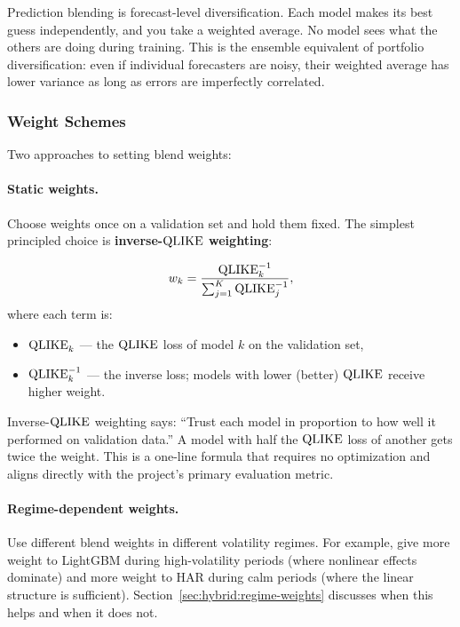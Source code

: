 \begin{intuition}
Prediction blending is forecast-level diversification.  Each model
makes its best guess independently, and you take a weighted average.
No model sees what the others are doing during training.  This is the
ensemble equivalent of portfolio diversification: even if individual
forecasters are noisy, their weighted average has lower variance as
long as errors are imperfectly correlated.
\end{intuition}

\subsubsection{Weight Schemes}

Two approaches to setting blend weights:

\paragraph{Static weights.}
Choose weights once on a validation set and hold them fixed.  The
simplest principled choice is \textbf{inverse-$\operatorname{QLIKE}$ weighting}:

\begin{equation}\label{eq:inv-qlike-weights}
  w_k = \frac{\operatorname{QLIKE}_k^{-1}}{\sum_{j=1}^{K}\operatorname{QLIKE}_j^{-1}},
\end{equation}
where each term is:
\begin{itemize}
  \item $\operatorname{QLIKE}_k$ --- the $\operatorname{QLIKE}$ loss of model $k$ on the
        validation set,
  \item $\operatorname{QLIKE}_k^{-1}$ --- the inverse loss; models with lower
        (better) $\operatorname{QLIKE}$ receive higher weight.
\end{itemize}

\begin{intuition}
Inverse-$\operatorname{QLIKE}$ weighting says: ``Trust each model in proportion to
how well it performed on validation data.''  A model with half the
$\operatorname{QLIKE}$ loss of another gets twice the weight.  This is a one-line
formula that requires no optimization and aligns directly with the
project's primary evaluation metric.
\end{intuition}

\paragraph{Regime-dependent weights.}
Use different blend weights in different volatility regimes.  For
example, give more weight to LightGBM during high-volatility periods
(where nonlinear effects dominate) and more weight to HAR during calm
periods (where the linear structure is sufficient).
Section~\ref{sec:hybrid:regime-weights} discusses when this helps and
when it does not.

